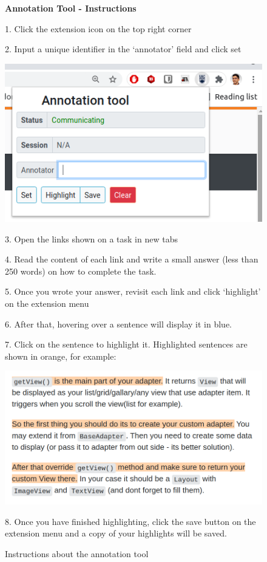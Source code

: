 

\begin{figure}
\begin{mdframed}[backgroundcolor=gray!04] 
\begin{scriptsize}

{\large \textbf{Annotation Tool - Instructions}} \bigskip


1. Click the extension icon on the top right corner \smallskip

2. Input a unique identifier in the `annotator' field and click set \smallskip


\begin{center}
    \includegraphics[width=.45\textwidth]{appendix/cp4/fig/annotation-tool.png} \smallskip
\end{center}

3. Open the links shown on a task in new tabs \smallskip

4. Read the content of each link and write a small answer (less than 250 words) on how to complete the task. \smallskip

5. Once you wrote your answer, revisit each link and click `highlight' on the extension menu \smallskip

6. After that, hovering over a sentence will display it in blue. \smallskip


7. Click on the sentence to highlight it. Highlighted sentences are shown in orange, for example: \smallskip


\begin{center}
    \includegraphics[width=.65\textwidth]{appendix/cp4/fig/highlight-orange.png} \smallskip
\end{center}


8. Once you have finished highlighting, click the save button on the extension menu and a copy of your highlights will be saved.

\end{scriptsize}
\end{mdframed}
\caption{Instructions about the annotation tool}
\end{figure}


